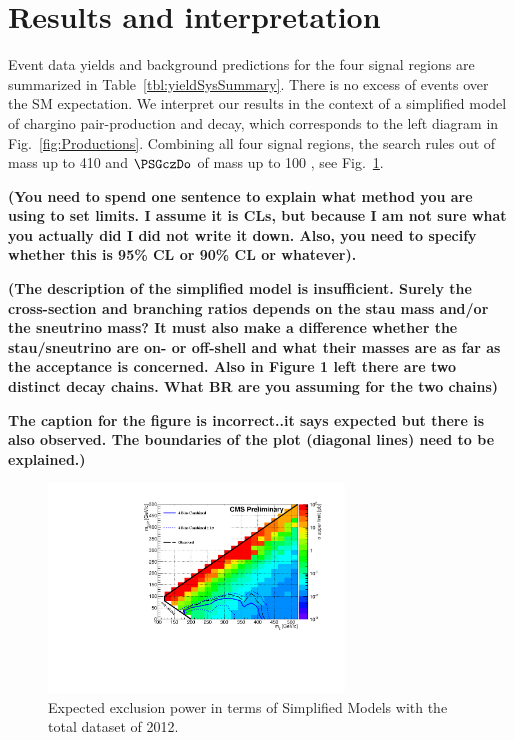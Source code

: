 \section{Results and interpretation}
\label{sect:stat}



Event data yields and background predictions for the four signal regions are summarized in Table~\ref{tbl:yieldSysSummary}.
There is no excess of events over the SM expectation.  We interpret our results in the context
of a simplified model of chargino pair-production and decay, which corresponds to the left
diagram in Fig.~\ref{fig:Productions}.  Combining all four signal regions,
the search rules out \chione of mass up to 410 \GeV and  $\PSGczDo$ of mass up to 100 \GeV,
see Fig.~\ref{fig:limit_final}.

{\bf (You need to spend one sentence to explain what method you are using to set limits.  I assume
  it is CLs, but because I am not sure what you actually did I did not write
  it down.  Also, you
  need to specify whether this is 95\% CL or 90\% CL or whatever).}

{\bf (The description of the simplified model is insufficient.  Surely the cross-section and branching
  ratios depends on the stau mass and/or the sneutrino mass?  It must also make a difference whether
  the stau/sneutrino are on- or off-shell and what their masses are as far as the acceptance
  is concerned.
  Also in Figure 1 left there are two distinct
  decay chains.  What BR are you assuming for the two chains)}

{\bf The caption for the figure is incorrect..it says expected but there is also observed.  The boundaries
  of the plot (diagonal lines) need to be explained.)}

\begin{linenomath}
\begin{figure}[h]
\centering
\includegraphics[width=0.7\textwidth,keepaspectratio=true]{StatisticsFig/Exclusion4Bins.pdf}
\caption{Expected exclusion power in terms of Simplified Models
with the total dataset of 2012. 
}
\label{fig:limit_final}
\end{figure}
\end{linenomath}



